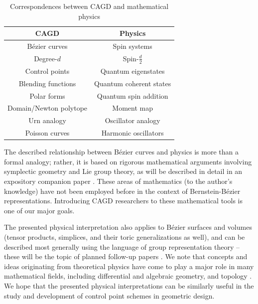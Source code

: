 \documentclass[final,3p,mathptmx]{elsarticle}
\begin{document}
\begin{table}[h]
	\centering
	\begin{tabular}[c]{|c|c|}
		\hline
		CAGD & Physics \\\hline\hline
		B\'{e}zier curves & Spin systems \\\hline
		Degree-$d$ & Spin-$\frac{d}{2}$ \\\hline
		Control points & Quantum eigenstates \\\hline
		Blending functions & Quantum coherent states \\\hline
		Polar forms & Quantum spin addition \\\hline
		Domain/Newton polytope & Moment map \\\hline
		Urn analogy & Oscillator analogy \\\hline
		Poisson curves & Harmonic oscillators \\ 
		\hline
	\end{tabular}
	\caption{Correspondences between CAGD and mathematical  physics}
	\label{tab:list}
\end{table}

The described relationship between B\'{e}zier curves and physics is more than a formal analogy; rather, it is based on rigorous mathematical arguments involving symplectic geometry and Lie group theory, as will be described in detail in an expository companion paper \cite{vaitkus2018physics}. These areas of mathematics (to the author's knowledge) have not been employed before in the context of Bernstein-B\'{e}zier representations. Introducing CAGD researchers to these mathematical tools is one of our major goals.
 
The presented physical interpretation also applies to B\'{e}zier surfaces and volumes (tensor products, simplices, and their toric generalizations \cite{krasauskas2002toric} as well), and can be described most generally using the language of group representation theory -- these will be the topic of planned follow-up papers \cite{vaitkus2018surface,vaitkus2018repthy}. We note that concepts and ideas originating from theoretical physics have come to play a major role in many mathematical fields, including differential and algebraic geometry, and topology \cite{atiyah2010geometry}. We hope that the presented physical interpretations can be similarly useful in the study and development of control point schemes in geometric design.
\end{document}
